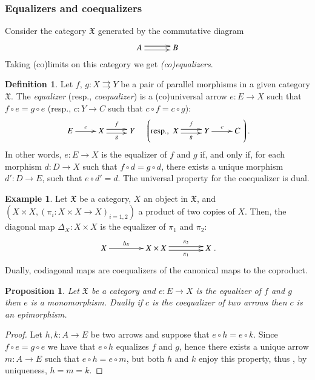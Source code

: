 \documentclass[12pt]{article}
\newtheorem{proposition}[lemma]{Proposition}
\theoremstyle{definition}
\newtheorem{definition}[lemma]{Definition}
\newtheorem{example}[lemma]{Example}
\def\X{\mathfrak X}
\numberwithin{equation}{section}
\begin{document}
\subsubsection{Equalizers and coequalizers}
Consider the category $\X$ generated by the commutative diagram
\[\xymatrix@C=30pt{
A \ar@<-.5ex>[r]\ar@<.5ex>[r] & B
}
\]
Taking (co)limits on this category we get \emph{(co)equalizers}.
\begin{definition}
Let $f,\, g\colon X\rightrightarrows Y$ be a pair of parallel morphisms in a given category $\X$. The {\em equalizer} (resp., {\em coequalizer}) is a (co)universal arrow $e\colon E\to X$ such that $f\circ e=g\circ e$ (resp., $c\colon Y\to C$ such that $c\circ f=c\circ g$):
\[
\xymatrix{E\ar[r]^e&X\ar@<-.5ex>[r]_g \ar@<.5ex>[r]^f&Y}\quad \left(\text{resp.}, \xymatrix{X\ar@<-.5ex>[r]_g \ar@<.5ex>[r]^f&Y\ar[r]^c&C}\right).
\]
In other words, $e\colon E\to X$ is the equalizer of $f$ and $g$ if, and only if, for each morphism $d\colon D\to X$ such that $f\circ d=g\circ d$, there exists a unique morphism $d'\colon D\to E$, such that $e\circ d'=d$. The universal property for the coequalizer is dual.
\end{definition}

\begin{example}\label{ex_eq_of_projections}
	Let $\X$ be a category, $X$ an object in $\X$, and $(X\times X, (\pi_i\colon X\times X\to X)_{i=1,2})$ a product of two copies of $X$. Then, the diagonal map $\Delta_X\colon X\times X$ is the equalizer of $\pi_1$ and $\pi_2$:
	\[
	\xymatrix@C=40pt{
		X\ar[r]^-{\Delta_X}&X\times X\ar@<-.5ex>[r]_-{\pi_1} \ar@<.5ex>[r]^-{\pi_2}&X}.
	\]
	Dually, codiagonal maps are coequalizers of the canonical maps to the coproduct. 
\end{example}
 
\begin{proposition}\label{reg_mono} Let $\X$ be a category and $e\colon E\to X$ is the equalizer of $f$ and $g$ then $e$ is a monomorphism. Dually if $c$ is the coequalizer of two arrows then $c$ is an epimorphism.
\end{proposition}
\begin{proof}
	Let $h,k:A\rightarrow E$ be two arrows and suppose that $e\circ h=e\circ k$. Since $f\circ e=g\circ e$ we have that $e\circ h$ equalizes $f$ and $g$, hence there exists a unique arrow $m:A\rightarrow E$ such that $e\circ h=e\circ m$, but both $h$ and $k$ enjoy this property, thus , by uniqueness,
$h=m=k$.
 \end{proof}
\end{document}
